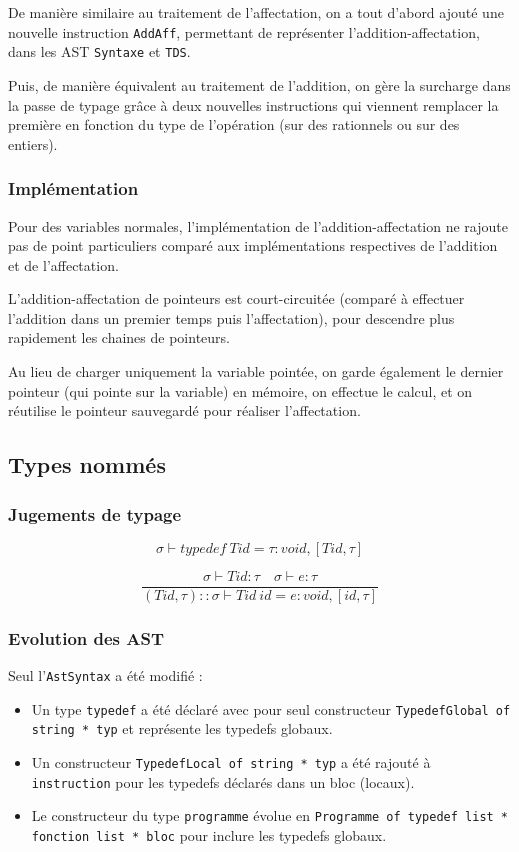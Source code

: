 \documentclass[headings=standardclasses,parskip=half]{scrartcl}
\begin{document}
De manière similaire au traitement de l'affectation, on a tout d'abord
ajouté une nouvelle instruction \texttt{AddAff}, permettant de
représenter l'addition-affectation, dans les AST \texttt{Syntaxe} et
\texttt{TDS}.

Puis, de manière équivalent au traitement de l'addition, on gère la
surcharge dans la passe de typage grâce à deux nouvelles instructions
qui viennent remplacer la première en fonction du type de l'opération
(sur des rationnels ou sur des entiers).

\subsubsection*{Implémentation}

Pour des variables normales, l'implémentation de l'addition-affectation
ne rajoute pas de point particuliers comparé aux implémentations
respectives de l'addition et de l'affectation.

L'addition-affectation de pointeurs est court-circuitée
(comparé à effectuer l'addition dans un premier temps
puis l'affectation), pour descendre plus rapidement les chaines
de pointeurs.

Au lieu de charger uniquement la variable pointée,
on garde également le dernier pointeur (qui pointe sur la variable)
en mémoire, on effectue le calcul, et on réutilise
le pointeur sauvegardé pour réaliser l'affectation.

\subsection{Types nommés}

\subsubsection*{Jugements de typage}

\[\sigma \vdash typedef\ Tid = \tau : void, [Tid,\tau]\]

\[\frac{\sigma \vdash Tid : \tau \quad \sigma \vdash e : \tau}
    {(Tid,\tau)::\sigma \vdash Tid\ id = e : void, [id, \tau]}\]

\subsubsection*{Evolution des AST}

Seul l'\texttt{AstSyntax} a été modifié :

\begin{itemize}
    \item Un type \texttt{typedef} a été déclaré avec pour seul
          constructeur \texttt{TypedefGlobal of string * typ} et
          représente les typedefs globaux.
    \item Un constructeur \texttt{TypedefLocal of string * typ} a
          été rajouté à \texttt{instruction} pour les typedefs
          déclarés dans un bloc (locaux).
    \item Le constructeur du type \texttt{programme} évolue en
          \texttt{Programme of typedef list * fonction list * bloc}
          pour inclure les typedefs globaux.
\end{itemize}
\end{document}
